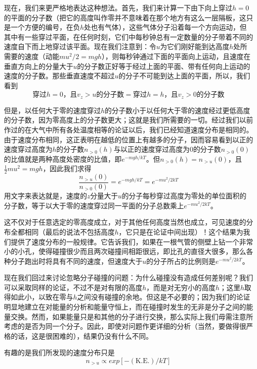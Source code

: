 现在，我们来更严格地表达这种想法。首先，我们来计算一下由下向上穿过$h=0$的平面的分子数（把它的高度叫作零并不意味着在那个地方有这么一层隔板，这只是一个方便的编号，在负$h$处也有气体），这些气体分子沿着每一个方向运动，但其中有一些穿过平面，在任何时刻，它们中每秒钟总有一定数量的分子带着不同的速度自下而上地穿过该平面。现在我们注意到：令$u$为它们刚好能到达高度$h$处所需要的速度（动能$mu^2/2=mgh$），则每秒钟通过下面的平面向上运动，且速度在垂直方向上的分量大于$u$的分子数正好等于经过上面的平面、带有任何向上运动的速度的分子数。那些垂直速度不超过$u$的分子不可能到达上面的平面，所以，我们看到
\begin{equation*}
    \text{穿过$h=0$，且$v_z>u$的分子数}=\text{穿过$h=h$，且$v_z>0$的分子数}
\end{equation*}

但是，以任何大于零的速度穿过$h$的分子数小于以任何大于零的速度经过更低高度的分子数，因为零高度上的分子数更大；这就是我们所需要的一切。经过我们以前作过的在大气中所有各处温度相等的论证以后，我们已经知道速度分布是相同的。由于速度分布相同，这正表明在越低的位置上有越多的分子，因而容易看到以正的速度穿过高度为$h$的分子数$n_{>0}(h)$与以正的速度穿过高度为$0$的分子数$n_{>0}(0)$的比值就是两种高度处密度的比值，即$e^{-mgh/kT}$。但$n_{>0}(h)=n_{>u}(0)$，且$\frac{1}{2}mu^2 = mgh$，因此我们求得
\begin{equation*}
    \frac{n_{>u}(0)}{n_{>0}(0)} = e^{-mgh/kT} = e^{-mu^2/2kT}
\end{equation*}
用文字来表达就是，速度的$z$分量大于$u$的分子每秒穿过高度为零处的单位面积的分子数，等于以大于零的速度穿过同一平面的分子总数乘上$e^{-mu^2/2kT}$。

这不仅对于任意选定的零高度成立，对于其他任何高度当然也成立，可见速度的分布全都相同（最后的说法不包括高度$h$，它只是在论证中间出现）！这个结果为我们提供了速度分布的一般规律。它告诉我们，如果在一根气管的侧壁上钻一个非常小的小孔，使得碰撞很少而且两次碰撞间相距很远，即比孔的直径大很多，那么各种分子跑出时将具有不同的速度，但速度大于$u$的分子所占的比例则是$e^{-mu^2/2kT}$。

现在我们回过来讨论忽略分子碰撞的问题：为什么碰撞没有造成任何差别呢？我们可以采取同样的论证，不过不是对有限的高度$h$，而是对无穷小的高度$h$；这里$h$取得如此小，以致在零与$h$之间没有碰撞的余地。但这是不必要的；因为我们的论证明显地建立在对能量的分析和能量守恒上，而在碰撞时发生的无非是分子之间的能量交换。然而，如果能量只是和其他的分子进行交换，那么实际上我们毋需注意所考虑的是否为同一个分子。因此，即使对问题作更详细的分析（当然，要做得很严格的话，这是很困难的），结果仍没有什么不同。

有趣的是我们所发现的速度分布只是
\begin{equation}
    \label{Eq:I:40:4}
    n_{>u} \propto exp[-(\text{K.E.})/kT] 
\end{equation}

